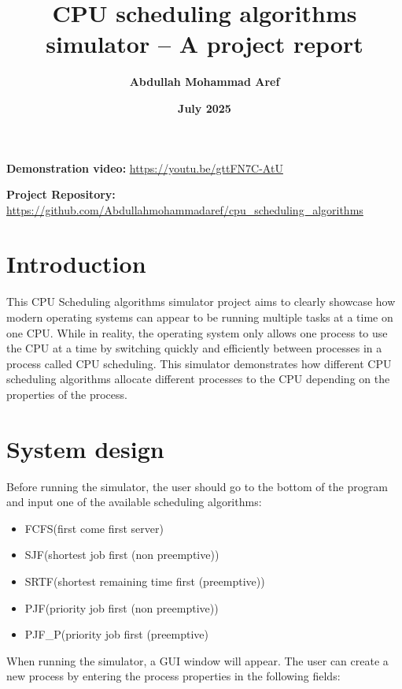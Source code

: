 \documentclass{article}
\title{\fontsize{19}{10}\textbf{CPU scheduling algorithms simulator – A project report}}
\author{\textbf{Abdullah Mohammad Aref}}
\date{\textbf{July 2025}}
\begin{document}
\maketitle

\begin{flushleft}
    
    \textbf{Demonstration video:}
    \url{https://youtu.be/gttFN7C-AtU}

    
    \textbf{Project Repository:}
    \url{https://github.com/Abdullahmohammadaref/cpu_scheduling_algorithms}
    
    
\end{flushleft}

\tableofcontents

\section{Introduction}

This CPU Scheduling algorithms simulator project aims to clearly showcase how modern operating systems can appear to be running multiple tasks at a time on one CPU. While in reality, the operating system only allows one process to use the CPU at a time by switching quickly and efficiently between processes in a process called CPU scheduling. This simulator demonstrates how different CPU scheduling algorithms allocate different processes to the CPU depending on the properties of the process.

\section{System design}

Before running the simulator, the user should go to the bottom of the program and input one of the available scheduling algorithms:
\begin{itemize}
    \item FCFS(first come first server) 
    \item SJF(shortest job first (non preemptive))
    \item SRTF(shortest remaining time first (preemptive)) 
    \item PJF(priority job first (non preemptive))
    \item PJF\_P(priority job first (preemptive)
\end{itemize}

When running the simulator, a GUI window will appear. The user can
create a new process by entering the process properties in the  following fields:
\end{document}
